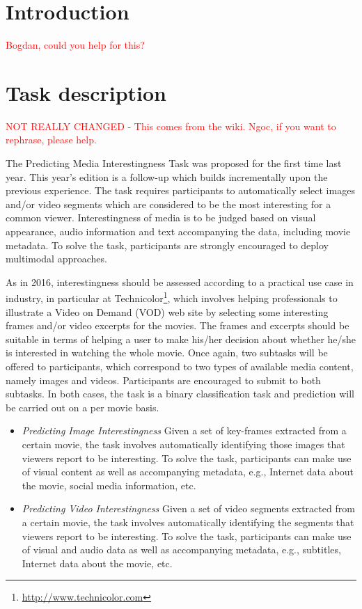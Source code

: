 \documentclass[sigconf]{acmart-me}
\begin{document}
\maketitle


\section{Introduction}

\textcolor{red}{Bogdan, could you help for this?}

\section{Task description}
\textcolor{red}{NOT REALLY CHANGED - This comes from the wiki. Ngoc, if you want to rephrase, please help.}

The Predicting Media Interestingness Task was proposed for the first time last year. This year's edition is a follow-up which builds incrementally upon the previous experience. The task requires participants to automatically select images and/or video segments which are considered to be the most interesting for a common viewer. Interestingness of media is to be judged based on visual appearance, audio information and text accompanying the data, including movie metadata. To solve the task, participants are strongly encouraged to deploy multimodal approaches.

As in 2016, interestingness should be assessed according to a practical use case in industry, in particular at Technicolor\footnote{\url{http://www.technicolor.com}}, which involves helping professionals to illustrate a Video on Demand (VOD) web site by selecting some interesting frames and/or video excerpts for the movies. The frames and excerpts should be suitable in terms of helping a user to make his/her decision about whether he/she is interested in watching the whole movie.
Once again, two subtasks will be offered to participants, which correspond to two types of available media content, namely images and videos. Participants are encouraged to submit to both subtasks. In both cases, the task is a binary classification task and prediction will be carried out on a per movie basis.

\begin{itemize}
\item \emph{Predicting Image Interestingness} Given a set of key-frames extracted from a certain movie, the task involves automatically identifying those images that viewers report to be interesting. To solve the task, participants can make use of visual content as well as accompanying metadata, e.g., Internet data about the movie, social media information, etc.
\item \emph{Predicting Video Interestingness} Given a set of video segments extracted from a certain movie, the task involves automatically identifying the segments that viewers report to be interesting. To solve the task, participants can make use of visual and audio data as well as accompanying metadata, e.g., subtitles, Internet data about the movie, etc.
\end{itemize}
\end{document}
